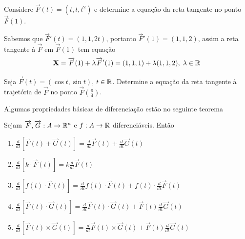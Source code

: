 \begin{example}
    Considere \(\overrightarrow{F}(t) = (t,t,t^2)\) e determine a equação da reta tangente no ponto \(\overrightarrow{F}(1)\).

    Sabemos que \(\overrightarrow{F}'(t) = (1,1,2t)\), portanto \(\overrightarrow{F}'(1) = (1,1,2)\), assim a reta tangente à \(\overrightarrow{F}\) em \(\overrightarrow{F}(1)\) tem equação \[\mathbf{X} = \overrightarrow{F}(1) + \lambda\overrightarrow{F}'(1) = (1,1,1) + \lambda (1,1,2),\; \lambda\in\mathbb{R}\]
\end{example}

\begin{exercise}
    Seja \(\overrightarrow{F}(t) = (\cos t,\sin t)\), \(t\in\mathbb{R}\). Determine a equação da reta tangente à trajetória de \(\overrightarrow{F}\) no ponto \(\overrightarrow{F}\left( \frac{\pi}{4} \right)\).
\end{exercise}

Algumas propriedades básicas de diferenciação estão no seguinte teorema

\begin{theorem}
    Sejam \(\overrightarrow{F},\overrightarrow{G}: A \to \mathbb{R}^n \) e \(f: A \to \mathbb{R}\) diferenciáveis. Então
        \begin{enumerate}
            \item \(\frac{d}{dt}[\overrightarrow{F}(t) + \overrightarrow{G}(t)] = \frac{d}{dt}\overrightarrow{F}(t) + \frac{d}{dt}\overrightarrow{G}(t)\)
            \item \(\frac{d}{dt}[k\cdot\overrightarrow{F}(t)] = k \frac{d}{dt}\overrightarrow{F}(t)\)
            \item \(\frac{d}{dt}[f(t)\cdot\overrightarrow{F}(t)] = \frac{d}{dt}f(t)\cdot\overrightarrow{F}(t) + f(t)\cdot\frac{d}{dt}\overrightarrow{F}(t)\)
            \item \(\frac{d}{dt}[\overrightarrow{F}(t)\cdot\overrightarrow{G}(t)] = \frac{d}{dt}\overrightarrow{F}(t)\cdot\overrightarrow{G}(t) + \overrightarrow{F}(t)\frac{d}{dt}\overrightarrow{G}(t)\)
            \item \(\frac{d}{dt}[\overrightarrow{F}(t)\times\overrightarrow{G}(t)] = \frac{d}{dt}\overrightarrow{F}(t)\times\overrightarrow{G}(t) + \overrightarrow{F}(t)\frac{d}{dt}\overrightarrow{G}(t)\)
        \end{enumerate}
\end{theorem}

